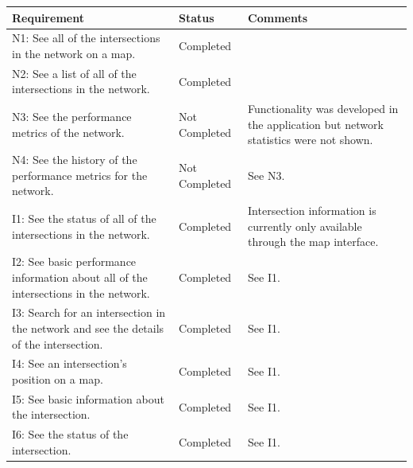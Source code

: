 \documentclass{report}
\begin{document}
\begin{longtable}[H]{| P{6.5cm} | P{2.5cm} | P{6cm} |}
    \hline
    \textbf{Requirement}                                                                            & \textbf{Status}        & \textbf{Comments}                                                                              \\ \hline
    N1: See all of the intersections in the network on a map.                              & Completed     & ~                                                                                     \\ \hline
    N2: See a list of all of the intersections in the network.                             & Completed     & ~                                                                                     \\ \hline
    N3: See the performance metrics of the network.                                        & Not Completed & Functionality was developed in the application but network statistics were not shown. \\ \hline
    N4: See the history of the performance metrics for the network.                        & Not Completed & See N3.                                                                               \\ \hline
    I1: See the status of all of the intersections in the network.                         & Completed     & Intersection information is currently only available through the map interface.       \\ \hline
    I2: See basic performance information about all of the intersections in the network.   & Completed     & See I1.                                                                               \\ \hline
    I3: Search for an intersection in the network and see the details of the intersection. & Completed     & See I1.                                                                               \\ \hline
    I4: See an intersection's position on a map.                                           & Completed     & See I1.                                                                               \\ \hline
    I5: See basic information about the intersection.                                      & Completed     & See I1.                                                                               \\ \hline
    I6: See the status of the intersection.                                                & Completed     & See I1.                                                                               \\ \hline

\end{longtable}
\end{document}

